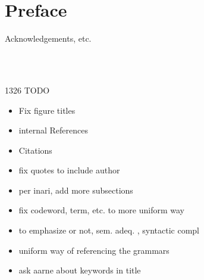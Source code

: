 \documentclass[11pt, a4paper]{article}
\begin{document}
\section*{Preface}

Acknowledgements, etc.

\thispagestyle{empty}

\newpage

\begin{spacing}{0.0}
\tableofcontents
\end{spacing}

\thispagestyle{empty}

\newpage
\setcounter{page}{1}

\begin{code}[hide]%
\>[0]\AgdaSymbol{\{-\#}\AgdaSpace{}%
\AgdaSpace{}%
\AgdaSpace{}%
\AgdaSymbol{\#-\}}\<%
\\
%
\\[\AgdaEmptyExtraSkip]%
\>[0]\AgdaSpace{}%
\AgdaSpace{}%
\<%
\end{code}

1326
TODO
\begin{itemize}
\item  Fix figure titles
\item internal References
\item Citations
\item fix quotes to include author
\item per inari, add more subsections
\item fix codeword, term, etc. to more uniform way
\item to emphasize or not, sem. adeq. , syntactic compl
\item uniform way of referencing the grammars
\item ask aarne about keywords in title
\end{itemize}

















% 




\newpage




\newpage


\end{document}
